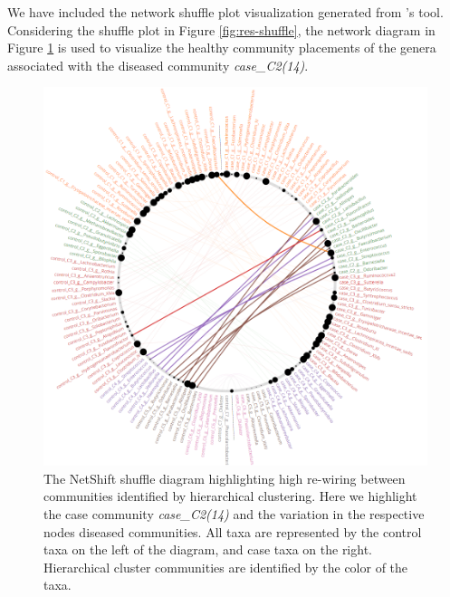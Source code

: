 We have included the network shuffle plot visualization generated from \citeauthor{Kuntal2018}'s tool. Considering the shuffle plot in Figure \ref{fig:res-shuffle}, the network diagram in Figure \ref{fig:res-high} is used to visualize the healthy community placements of the genera associated with the diseased community \textit{case\_C2(14)}.
\begin{figure}[htb!]
    \centering
    \includegraphics[width=1.0\linewidth]{figure/results/rewire_network.png}
    \caption[The NetShift shuffle diagram highlighting high re-wiring between communities identified by hierarchical clustering.]{The NetShift shuffle diagram highlighting high re-wiring between communities identified by hierarchical clustering. Here we highlight the case community \textit{case\_C2(14)} and the variation in the respective nodes diseased communities. All taxa are represented by the control taxa on the left of the diagram, and case taxa on the right. Hierarchical cluster communities are identified by the color of the taxa.}
    \label{fig:res-high}
\end{figure}
